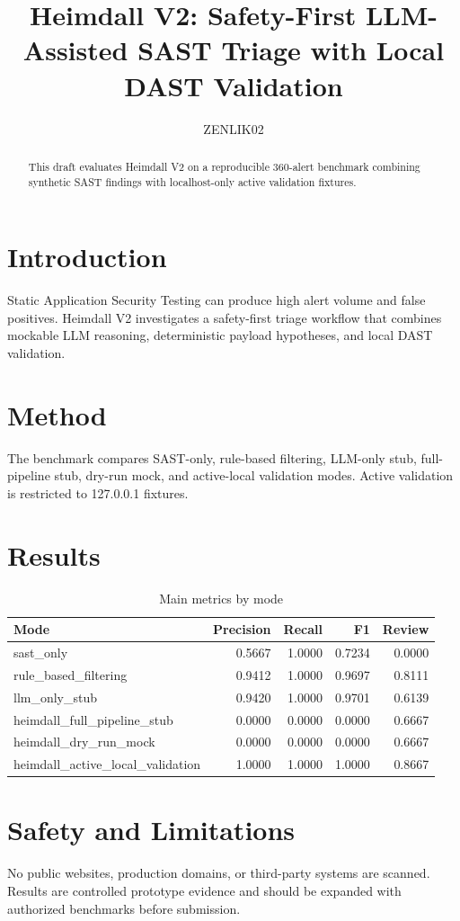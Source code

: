 \documentclass[conference]{IEEEtran}
\title{Heimdall V2: Safety-First LLM-Assisted SAST Triage with Local DAST Validation}
\author{ZENLIK02}
\begin{document}
\maketitle
\begin{abstract}
This draft evaluates Heimdall V2 on a reproducible 360-alert benchmark combining synthetic SAST findings with localhost-only active validation fixtures.
\end{abstract}
\section{Introduction}
Static Application Security Testing can produce high alert volume and false positives. Heimdall V2 investigates a safety-first triage workflow that combines mockable LLM reasoning, deterministic payload hypotheses, and local DAST validation.
\section{Method}
The benchmark compares SAST-only, rule-based filtering, LLM-only stub, full-pipeline stub, dry-run mock, and active-local validation modes. Active validation is restricted to 127.0.0.1 fixtures.
\section{Results}
\begin{table}[h]
\centering
\caption{Main metrics by mode}
\begin{tabular}{lrrrr}
\toprule
Mode & Precision & Recall & F1 & Review \\
\midrule
sast_only & 0.5667 & 1.0000 & 0.7234 & 0.0000 \\
rule_based_filtering & 0.9412 & 1.0000 & 0.9697 & 0.8111 \\
llm_only_stub & 0.9420 & 1.0000 & 0.9701 & 0.6139 \\
heimdall_full_pipeline_stub & 0.0000 & 0.0000 & 0.0000 & 0.6667 \\
heimdall_dry_run_mock & 0.0000 & 0.0000 & 0.0000 & 0.6667 \\
heimdall_active_local_validation & 1.0000 & 1.0000 & 1.0000 & 0.8667 \\
\bottomrule
\end{tabular}
\end{table}
\section{Safety and Limitations}
No public websites, production domains, or third-party systems are scanned. Results are controlled prototype evidence and should be expanded with authorized benchmarks before submission.


\end{document}

